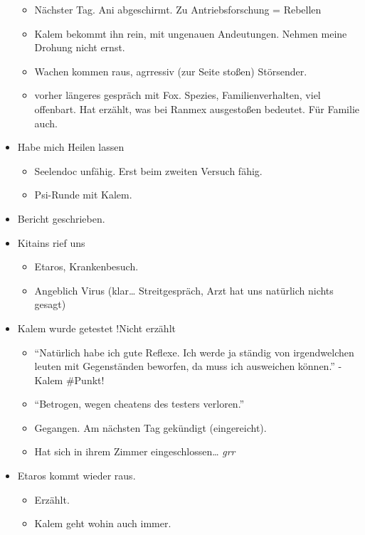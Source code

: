 \documentclass[11pt]{article}
\begin{document}
\begin{itemize}
  \begin{itemize}
  \item
    Nächster Tag. Ani abgeschirmt. Zu Antriebsforschung = Rebellen
  \item
    Kalem bekommt ihn rein, mit ungenauen Andeutungen. Nehmen meine
    Drohung nicht ernst.
  \item
    Wachen kommen raus, agrressiv (zur Seite stoßen) Störsender.
  \item
    vorher längeres gespräch mit Fox. Spezies, Familienverhalten, viel
    offenbart. Hat erzählt, was bei Ranmex ausgestoßen bedeutet. Für
    Familie auch.
  \end{itemize}
\item
  Habe mich Heilen lassen

  \begin{itemize}
  \item
    Seelendoc unfähig. Erst beim zweiten Versuch fähig.
  \item
    Psi-Runde mit Kalem.
  \end{itemize}
\item
  Bericht geschrieben.
\item
  Kitains rief uns

  \begin{itemize}
  \item
    Etaros, Krankenbesuch.
  \item
    Angeblich Virus (klar\ldots{} Streitgespräch, Arzt hat uns natürlich
    nichts gesagt)
  \end{itemize}
\item
  Kalem wurde getestet !Nicht erzählt

  \begin{itemize}
  \item
    ``Natürlich habe ich gute Reflexe. Ich werde ja ständig von
    irgendwelchen leuten mit Gegenständen beworfen, da muss ich
    ausweichen können.'' -Kalem \#Punkt!
  \item
    ``Betrogen, wegen cheatens des testers verloren.''
  \item
    Gegangen. Am nächsten Tag gekündigt (eingereicht).
  \item
    Hat sich in ihrem Zimmer eingeschlossen\ldots{} \emph{grr}
  \end{itemize}
\item
  Etaros kommt wieder raus.

  \begin{itemize}
  \item
    Erzählt.
  \item
    Kalem geht wohin auch immer.
  \end{itemize}
\end{itemize}
\end{document}
